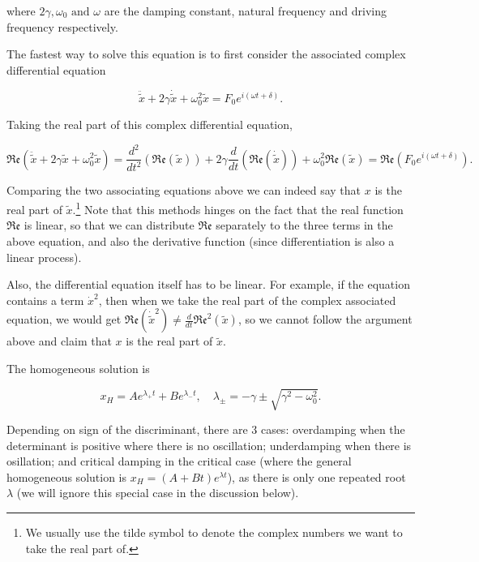 \documentclass[english,a4paper,12pt]{report}
\begin{document}
where \(2\gamma , \omega _{0} \text { and } \omega  \) are the damping constant, natural frequency and driving frequency respectively.  

The fastest way to solve this equation is to first consider the associated complex differential equation 

\begin{equation}
      \ddot{\tilde{x} } + 2 \gamma \dot{\tilde{x} } + \omega _{0}^2 \tilde{x} = F_0 e^{i(\omega t+\delta )}.  
\end{equation}

Taking the real part of this complex differential equation, 

\begin{equation}
    \mathfrak{Re} \left(  \ddot{\tilde{x} } + 2 \gamma \tilde{x}  + \omega _{0}^2 \tilde{x}\right) = \frac{d^2}{dt^2} \left(\mathfrak{Re} (\tilde{x} ) \right) + 2\gamma \frac{d}{dt} \left( \mathfrak{Re} (\dot{\tilde{x} } )  \right) + \omega _{0}^2\mathfrak{Re} (\tilde{x} ) = \mathfrak{Re} \left(   F_0 e^{i(\omega t+\delta )}  \right).
\end{equation}

Comparing the two associating equations above we can indeed say that \(x\) is the real part of \(\tilde{x} \).\footnote{We usually use the tilde symbol to denote the complex numbers we want to take the real part of.} Note that this methods hinges on the fact that the real function \(\mathfrak{Re} \) is linear, so that we can distribute \(\mathfrak{Re} \) separately to the three terms in the above equation, and also the derivative function (since differentiation is also a linear process).

Also, the differential equation itself has to be linear. For example, if the equation contains a term \(\dot{x}^2 \), then when we take the real part of the complex associated equation, we would get \(\displaystyle \mathfrak{Re} (\dot{\tilde{x} }^2) \neq \frac{d}{dt} \mathfrak{Re}^2\left( \tilde{x }  \right)    \), so we cannot follow the argument above and claim that \(x\) is the real part of \(\tilde{x} \). 

The homogeneous solution is 

\begin{equation}
    x_{H} = Ae^{\lambda _{+} t} + Be^{\lambda _{-}t }, \quad \lambda _{\pm } = -\gamma  \pm \sqrt{\gamma ^2 - \omega _{0}^2 }.        
\end{equation}

Depending on sign of the discriminant, there are 3 cases: overdamping when the determinant is positive where there is no oscillation; underdamping when there is osillation; and critical damping in the critical case (where the general homogeneous solution is \(x_{H} = (A+Bt)e^{\lambda t}\)), as there is only one repeated root \(\lambda \) (we will ignore this special case in the discussion below). 
\end{document}
